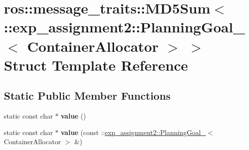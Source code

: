 \hypertarget{structros_1_1message__traits_1_1MD5Sum_3_01_1_1exp__assignment2_1_1PlanningGoal___3_01ContainerAllocator_01_4_01_4}{}\section{ros\+:\+:message\+\_\+traits\+:\+:M\+D5\+Sum$<$ \+:\+:exp\+\_\+assignment2\+:\+:Planning\+Goal\+\_\+$<$ Container\+Allocator $>$ $>$ Struct Template Reference}
\label{structros_1_1message__traits_1_1MD5Sum_3_01_1_1exp__assignment2_1_1PlanningGoal___3_01ContainerAllocator_01_4_01_4}
\subsection*{Static Public Member Functions}
\begin{DoxyCompactItemize}
\item 
\mbox{\label{structros_1_1message__traits_1_1MD5Sum_3_01_1_1exp__assignment2_1_1PlanningGoal___3_01ContainerAllocator_01_4_01_4_ae5a7a176eac3a54422904764391254ad}} 
static const char $\ast$ {\bfseries value} ()
\item 
\mbox{\label{structros_1_1message__traits_1_1MD5Sum_3_01_1_1exp__assignment2_1_1PlanningGoal___3_01ContainerAllocator_01_4_01_4_a6d8f125822cc4c41b320867637c0efa4}} 
static const char $\ast$ {\bfseries value} (const \+::\hyperlink{structexp__assignment2_1_1PlanningGoal__}{exp\+\_\+assignment2\+::\+Planning\+Goal\+\_\+}$<$ Container\+Allocator $>$ \&)
\end{DoxyCompactItemize}
